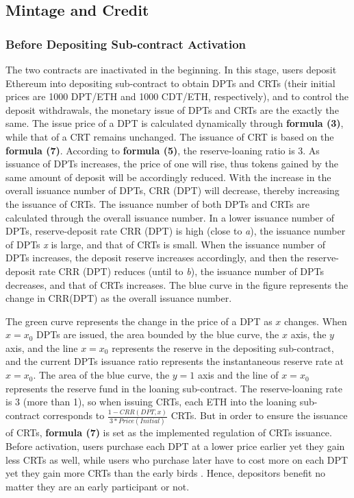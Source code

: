 \documentclass[a4paper, 10pt, conference]{ieeeconf} %
\begin{document}
\subsection{Mintage and Credit}
\subsubsection{Before Depositing Sub-contract Activation}
The two contracts are inactivated in the beginning. In this stage, users deposit Ethereum into depositing sub-contract to obtain DPTs and CRTs (their initial prices are 1000 DPT/ETH and 1000 CDT/ETH, respectively), and to control the deposit withdrawals, the monetary issue of DPTs and CRTs are the exactly the same. The issue price of a DPT is calculated dynamically through \textbf{formula (3)}, while that of a CRT remains unchanged. The issuance of CRT is based on the \textbf{formula (7)}. According to \textbf{formula (5)}, the reserve-loaning ratio is 3. As issuance of DPTs increases, the price of one will rise, thus tokens gained by the same amount of deposit will be accordingly reduced. With the increase in the overall issuance number of DPTs, CRR (DPT) will decrease, thereby increasing the issuance of CRTs. The issuance number of both DPTs and CRTs are calculated through the overall issuance number. In a lower issuance number of DPTs, reserve-deposit rate CRR (DPT) is high (close to \emph{a}), the issuance number of DPTs \emph{x} is large, and that of CRTs is small. When the issuance number of DPTs increases, the deposit reserve increases accordingly, and then the reserve-deposit rate CRR (DPT) reduces (until to \emph{b}), the issuance number of DPTs decreases, and that of CRTs increases. The blue curve in the figure represents the change in CRR(DPT) as the overall issuance number.

The green curve represents the change in the price of a DPT as $x$ changes. When ${x = x_0}$ DPTs are issued, the area bounded by the blue curve, the  $x$ axis, the  $y$ axis, and the line ${x = x_0}$ represents the reserve in the depositing sub-contract, and the current DPTs issuance ratio represents the instantaneous reserve rate at ${x = x_0}$. The area of the blue curve, the ${y = 1}$ axis and the line of ${x = x_0}$ represents the reserve fund in the loaning sub-contract. The reserve-loaning rate is 3 (more than 1), so when issuing CRTs, each ETH into the loaning sub-contract corresponds to ${\frac{1 - CRR(DPT, x)}{3 * Price(Initial)}}$ CRTs. But in order to ensure the issuance of CRTs, \textbf{formula (7)} is set as the implemented regulation of CRTs issuance. Before activation, users purchase each DPT at a lower price earlier yet they gain less CRTs as well, while users who purchase later have to cost more on each DPT yet they gain more CRTs than the early birds . Hence, depositors benefit no matter they are an early participant or not.
\end{document}
